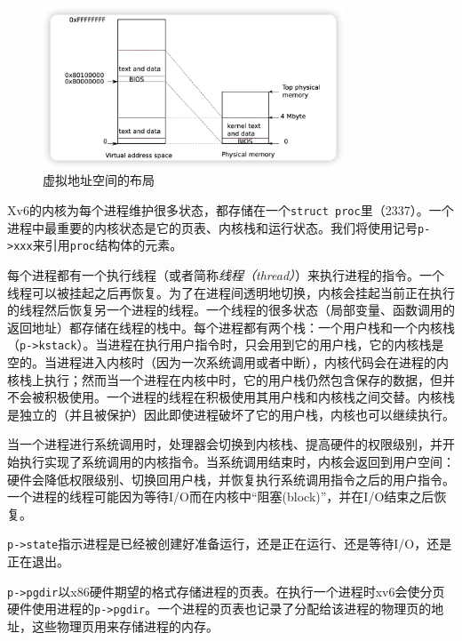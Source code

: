 \begin{figure}[htbp]
    \centering
    \includegraphics[width=0.8\textwidth]{../imgs/f1-3.png}
    \caption{虚拟地址空间的布局}
    \label{f1-3}
\end{figure}

Xv6的内核为每个进程维护很多状态，都存储在一个\texttt{struct proc}里（2337）。一个进程中最重要的内核状态是它的页表、内核栈和运行状态。我们将使用记号\texttt{p->xxx}来引用\texttt{proc}结构体的元素。

每个进程都有一个执行线程（或者简称\emph{线程（thread）}）来执行进程的指令。一个线程可以被挂起之后再恢复。为了在进程间透明地切换，内核会挂起当前正在执行的线程然后恢复另一个进程的线程。一个线程的很多状态（局部变量、函数调用的返回地址）都存储在线程的栈中。每个进程都有两个栈：一个用户栈和一个内核栈（\texttt{p->kstack}）。当进程在执行用户指令时，只会用到它的用户栈，它的内核栈是空的。当进程进入内核时（因为一次系统调用或者中断），内核代码会在进程的内核栈上执行；然而当一个进程在内核中时，它的用户栈仍然包含保存的数据，但并不会被积极使用。一个进程的线程在积极使用其用户栈和内核栈之间交替。内核栈是独立的（并且被保护）因此即使进程破坏了它的用户栈，内核也可以继续执行。

当一个进程进行系统调用时，处理器会切换到内核栈、提高硬件的权限级别，并开始执行实现了系统调用的内核指令。当系统调用结束时，内核会返回到用户空间：硬件会降低权限级别、切换回用户栈，并恢复执行系统调用指令之后的用户指令。一个进程的线程可能因为等待I/O而在内核中“阻塞(block)”，并在I/O结束之后恢复。

\texttt{p->state}指示进程是已经被创建好准备运行，还是正在运行、还是等待I/O，还是正在退出。

\texttt{p->pgdir}以x86硬件期望的格式存储进程的页表。在执行一个进程时xv6会使分页硬件使用进程的\texttt{p->pgdir}。一个进程的页表也记录了分配给该进程的物理页的地址，这些物理页用来存储进程的内存。
